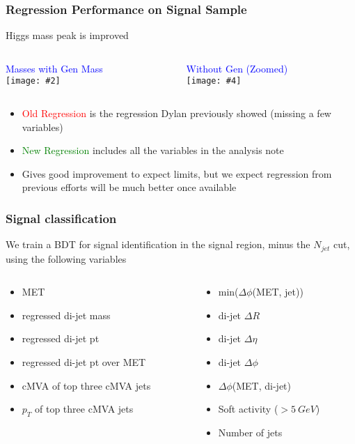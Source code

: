 \documentclass{beamer}
\newcommand{\twofigs}[4]{
  \begin{columns}
    \begin{column}{0.5\linewidth}
      \centering
      \textcolor{blue}{#1} \\
      \texttt{[image: \#2]}
    \end{column}
    \begin{column}{0.5\linewidth}
      \centering
      \textcolor{blue}{#3} \\
      \texttt{[image: \#4]}
    \end{column}
  \end{columns}
}
\begin{document}
\begin{frame}
  \frametitle{Regression Performance on Signal Sample}

  Higgs mass peak is improved

  \twofigs{Masses with Gen Mass}
          {180209_v1/regression_withgen.pdf}
          {Without Gen (Zoomed)}
          {180209_v1/regression.pdf}

  \begin{itemize}
  \item \textcolor{red}{Old Regression} is the regression Dylan previously showed
    (missing a few variables)
  \item \textcolor{green}{New Regression} includes all the variables in the analysis note
  \item Gives good improvement to expect limits,
    but we expect regression from previous efforts will be much better once available
  \end{itemize}

\end{frame}

\begin{frame}
  \frametitle{Signal classification}
  We train a BDT for signal identification in the signal region, minus the $N_{jet}$ cut,
  using the following variables

  \begin{columns}
    \begin{column}{0.5\linewidth}
      \begin{itemize}
      \item MET
      \item regressed di-jet mass
      \item regressed di-jet pt
      \item regressed di-jet pt over MET
      \item cMVA of top three cMVA jets
      \item $p_T$ of top three cMVA jets
      \end{itemize}
    \end{column}
    \begin{column}{0.5\linewidth}
      \begin{itemize}
      \item min($\Delta \phi$(MET, jet))
      \item di-jet $\Delta R$
      \item di-jet $\Delta \eta$
      \item di-jet $\Delta \phi$
      \item $\Delta \phi$(MET, di-jet)
      \item Soft activity ($> \SI{5}{GeV}$)
      \item Number of jets
      \end{itemize}
    \end{column}
  \end{columns}
\end{frame}
\end{document}
